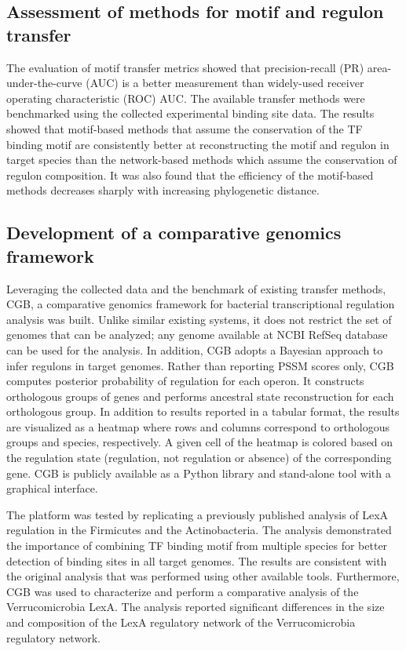\subsection{Assessment of methods for motif and regulon transfer}

The evaluation of motif transfer metrics showed that precision-recall (PR)
area-under-the-curve (AUC) is a better measurement than widely-used receiver
operating characteristic (ROC) AUC\@. The available transfer methods were
benchmarked using the collected experimental binding site data. The results
showed that motif-based methods that assume the conservation of the TF binding
motif are consistently better at reconstructing the motif and regulon in target
species than the network-based methods which assume the conservation of regulon
composition. It was also found that the efficiency of the motif-based methods
decreases sharply with increasing phylogenetic distance.

\subsection{Development of a comparative genomics framework}

Leveraging the collected data and the benchmark of existing transfer methods,
CGB, a comparative genomics framework for bacterial transcriptional regulation
analysis was built. Unlike similar existing systems, it does not restrict the
set of genomes that can be analyzed; any genome available at NCBI RefSeq
database can be used for the analysis. In addition, CGB adopts a Bayesian
approach to infer regulons in target genomes. Rather than reporting PSSM scores
only, CGB computes posterior probability of regulation for each operon. It
constructs orthologous groups of genes and performs ancestral state
reconstruction for each orthologous group. In addition to results reported in a
tabular format, the results are visualized as a heatmap where rows and columns
correspond to orthologous groups and species, respectively. A given cell of the
heatmap is colored based on the regulation state (regulation, not regulation or
absence) of the corresponding gene. CGB is publicly available as a Python
library and stand-alone tool with a graphical interface.

The platform was tested by replicating a previously published analysis of LexA
regulation in the Firmicutes and the Actinobacteria. The analysis demonstrated the
importance of combining TF binding motif from multiple species for better
detection of binding sites in all target genomes. The results are consistent
with the original analysis that was performed using other available
tools. Furthermore, CGB was used to characterize and perform a comparative analysis
of the Verrucomicrobia LexA. The analysis reported significant
differences in the size and composition of the LexA regulatory network of the
Verrucomicrobia regulatory network.

